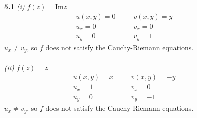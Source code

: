 \begin{enumerate}

\item[\textbf{5.1}] 
\textit{(i)}
$f(z) = \text{Im} z$ \\
\begin{align*}
u(x,y) = 0 ~~~~&~~~~ v(x,y) = y \\
u_x = 0 ~~~~&~~~~ v_x = 0 \\
u_y = 0 ~~~~&~~~~ v_y = 1 
\end{align*}
$u_x \ne v_y$, so $f$ does not satisfy the Cauchy-Riemann equations.
\\\\
\textit{(ii)}
$f(z) = \overline{z}$ \\
\begin{align*}
u(x,y) = x ~~~~&~~~~ v(x,y) = -y \\
u_x = 1 ~~~~&~~~~ v_x = 0 \\
u_y = 0 ~~~~&~~~~ v_y = -1 
\end{align*}
$u_x \ne v_y$, so $f$ does not satisfy the Cauchy-Riemann equations.


\end{enumerate}
